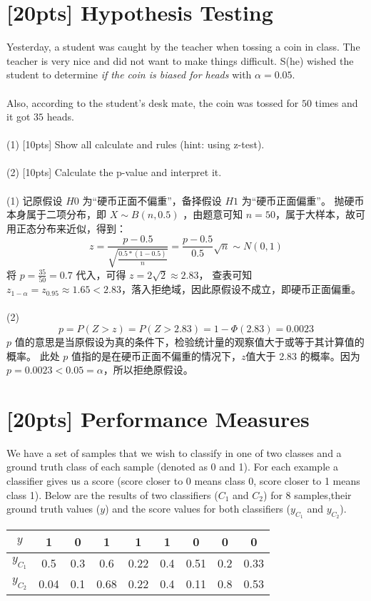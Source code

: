 \documentclass{article}
\begin{document}
	\section{[20pts] Hypothesis Testing}
	Yesterday, a student was caught by the teacher when tossing a coin in class. The teacher is very nice and did not want to make things difficult. S(he) wished the student to determine \emph{if the coin is biased for heads} with $\alpha = 0.05$.\\ \\
	Also, according to the student’s desk mate, the coin was tossed for $50$ times and it got $35$ heads. \\ \\
	(1) [10pts] Show all calculate and rules (hint: using z-test). \\ \\
	(2) [10pts] Calculate the p-value and interpret it. \\ \\
	(1) 记原假设 $H0$ 为“硬币正面不偏重”，备择假设 $H1$ 为“硬币正面偏重”。
	抛硬币本身属于二项分布，即 $X \sim B(n, 0.5)$ ，由题意可知 $n = 50$，属于大样本，故可用正态分布来近似，得到：
	\begin{equation}
	z = \frac{p-0.5}{\sqrt{\frac{0.5*(1-0.5)}{n}}} = \frac{p-0.5}{0.5}\sqrt{n} \sim N(0, 1)
	\end{equation}
	将 $p = \frac{35}{50} = 0.7$ 代入，可得 $z = 2\sqrt{2} \approx 2.83$，
	查表可知$z_{1-\alpha} = z_{0.95} \approx 1.65 < 2.83$，落入拒绝域，因此原假设不成立，即硬币正面偏重。\\ \\
	(2) \begin{equation}
		p = P(Z > z) = P(Z > 2.83) = 1 - \Phi(2.83) = 0.0023
		\end{equation}
		$p$ 值的意思是当原假设为真的条件下，检验统计量的观察值大于或等于其计算值的概率。
		此处 $p$ 值指的是在硬币正面不偏重的情况下，$z$值大于 2.83 的概率。因为 $p = 0.0023 < 0.05 = \alpha$，所以拒绝原假设。 \\
	\section{[20pts] Performance Measures}
	We have a set of samples that we wish to classify in one of two classes and a ground truth class of each sample (denoted as 0 and 1). For each example a classifier gives us a score (score closer to 0 means class 0, score closer to 1 means class 1). Below are the results of two classifiers ($C_1$ and $C_2$) for 8 samples,their ground truth values ($y$) and the score values for both classifiers ($y_{C_1}$ and $y_{C_2}$).
	\begin{table}[htbp]
		\centering
		\begin{tabular}{c|cccccccc}
			\hline
			$y$ & 1 & 0 & 1 & 1 & 1 & 0 & 0 & 0\\
			\hline
			$y_{C_1}$ & 0.5 & 0.3 & 0.6 & 0.22 & 0.4 & 0.51 & 0.2 & 0.33\\
			\hline
			$y_{C_2}$ & 0.04 & 0.1 & 0.68 & 0.22 & 0.4 & 0.11 & 0.8 & 0.53\\
			\hline
		\end{tabular}
	\end{table}
	
\end{document}
